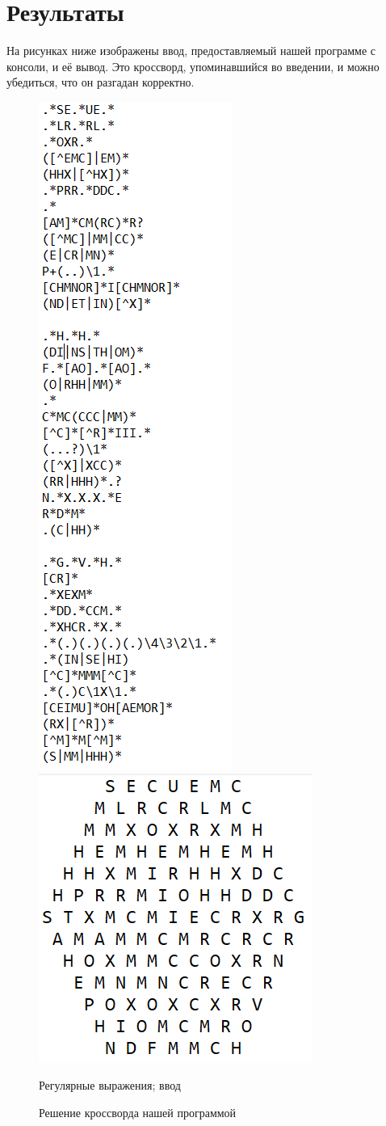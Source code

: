 \documentclass[12pt]{article}
\begin{document}
\section{ Результаты }
        На рисунках ниже изображены ввод, предоставляемый нашей программе с консоли, и её вывод. Это кроссворд, упоминавшийся во введении, и можно убедиться, что он разгадан корректно.
    \begin{multicols}{2}
        \begin{figure}[ht!]
            \includegraphics[width=.3\textwidth]{HexagonalInput1.png}\hfill
            \includegraphics[width=.3\textwidth]{HexagonalOutput1.PNG}\hfill
            \caption{Регулярные выражения; ввод}
            \caption{Решение кроссворда нашей программой}
        \end{figure}
    \end{multicols}
    \newpage %
    

    \newpage %


    

        
\end{document}
